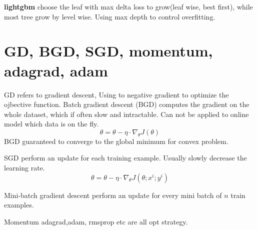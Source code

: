 \documentclass{article}
\begin{document}
\textbf{lightgbm} choose the leaf with max delta loss to grow(leaf wise, best first), while most tree grow by level wise. Using max depth to control overfitting.

\section{GD, BGD, SGD, momentum, adagrad, adam}
GD refers to gradient descent, Using to negative gradient to optimize the ojbective function.
Batch gradient descent (BGD) computes the gradient on the whole dataset, which if often slow and intractable. Can not be applied to online model which data is on the fly. 
$$\theta=\theta - \eta \cdot \nabla_{\theta} J(\theta)$$
BGD guaranteed to converge to the global minimum for convex problem.

SGD perform an update for each training example. Usually slowly decrease the learning rate.
$$\theta=\theta - \eta \cdot \nabla_{\theta} J(\theta; x^{i};y^{i})$$

Mini-batch gradient descent perform an update for every mini batch of $n$ train examples. 

Momentum adagrad,adam, rmsprop etc are all opt strategy.




\end{document}
